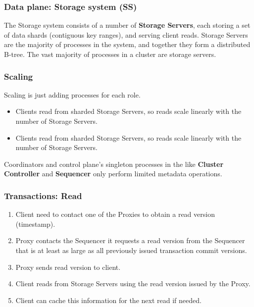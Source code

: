 

\begin{frame}
	\frametitle{Data plane: Storage system (SS)}
The Storage system consists of a number of \textbf{Storage Servers}, each
storing a set of data shards (contiguous key ranges),
and serving client reads. Storage Servers are the majority of processes in the system, and together they form a distributed B-tree.
The vast majority of processes in a cluster are storage servers.
	
\end{frame}

\begin{frame}
	\frametitle{Scaling}
Scaling is just adding processes for each role. \\

\begin{itemize}
    \item Clients read from sharded Storage Servers, so reads scale
linearly with the number of Storage Servers. 
\item Clients read from sharded Storage Servers, so reads scale
linearly with the number of Storage Servers. 
\end{itemize}

Coordinators and control plane's singleton processes in the  like \textbf{Cluster Controller} and \textbf{Sequencer} only perform limited metadata operations.
	
\end{frame}


\begin{frame}
	\frametitle{Transactions: Read}
\begin{enumerate}
    \item Client need to contact one of the Proxies to obtain a read version (timestamp).
    \item Proxy contacts the Sequencer it requests a read version from the Sequencer that is at least as large as all previously issued transaction commit versions.
    \item Proxy sends read version to client.
    \item Client reads from Storage Servers using the read version issued by the Proxy.
    \item Client can cache this information for the next read if needed.
\end{enumerate}

\end{frame}

